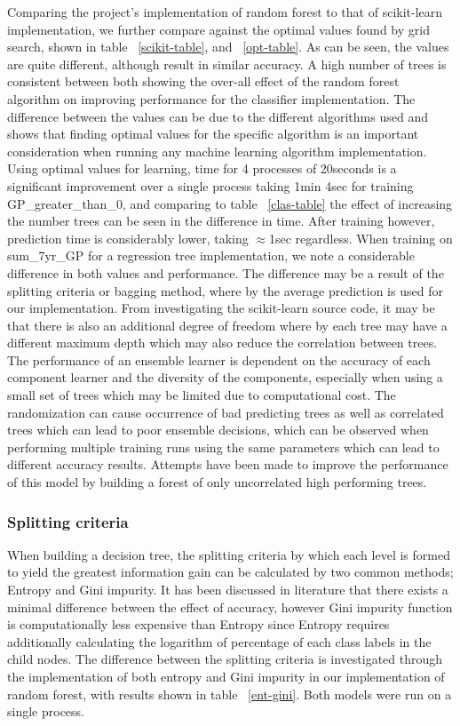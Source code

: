 \documentclass{article} %
\begin{document}
Comparing the project's implementation of random forest to that of scikit-learn implementation, we further compare against the optimal values found by grid search, shown in table ~\ref{scikit-table}, and ~\ref{opt-table}. As can be seen, the values are quite different, although result in similar accuracy. A high number of trees is consistent between both showing the over-all effect of the random forest algorithm on improving performance for the classifier implementation. The difference between the values can be due to the different algorithms used and shows that finding optimal values for the specific algorithm is an important consideration when running any machine learning algorithm implementation. Using optimal values for learning, time for 4 processes of 20seconds is a significant improvement over a single process taking 1min 4sec for training GP\_greater\_than\_0, and comparing to table ~\ref{clas-table} the effect of increasing the number trees can be seen in the difference in time. After training however, prediction time is considerably lower, taking $\approx$1sec regardless. When training on sum\_7yr\_GP for a regression tree implementation, we note a considerable difference in both values and performance. The difference may be a result of the splitting criteria or bagging method, where by the average prediction is used for our implementation. From investigating the scikit-learn source code, it may be that there is also an additional degree of freedom where by each tree may have a different maximum depth which may also reduce the correlation between trees. The performance of an ensemble learner is dependent on the accuracy of each component learner and the diversity of the components, especially when using a small set of trees which may be limited due to computational cost. The randomization can cause occurrence of bad predicting trees as well as correlated trees which can lead to poor ensemble decisions, which can be observed when performing multiple training runs using the same parameters which can lead to different accuracy results. Attempts have been made to improve the performance of this model by building a forest of only uncorrelated high performing trees. \cite{Bharathidason2014}

\subsubsection{Splitting criteria}

When building a decision tree, the splitting criteria by which each level is formed to yield the greatest information gain can be calculated by two common methods; Entropy and Gini impurity. It has been discussed in literature that there exists a minimal difference between the effect of accuracy, however Gini
impurity function is computationally less expensive than Entropy since Entropy requires additionally calculating the logarithm of percentage of each class labels in the child nodes. The difference between the splitting criteria is investigated through the implementation of both entropy and Gini impurity in our implementation of random forest, with results shown in table ~\ref{ent-gini}. Both models were run on a single process.
\end{document}
